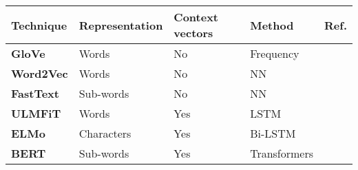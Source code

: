 \begin{tabular}{|l|l|l|l|c|} \hline
\textbf{Technique} & \textbf{Representation} & \textbf{Context vectors} & \textbf{Method} & \textbf{Ref.} \\ \hline
\textbf{GloVe} & Words & No & Frequency &  \\ \hline
\textbf{Word2Vec} & Words & No & NN &  \\ \hline
\textbf{FastText} & Sub-words & No & NN &  \\ \hline
\textbf{ULMFiT} & Words & Yes & LSTM &  \\ \hline
\textbf{ELMo} & Characters & Yes & Bi-LSTM &  \\ \hline
\textbf{BERT} & Sub-words & Yes & Transformers &  \\ \hline
\end{tabular}